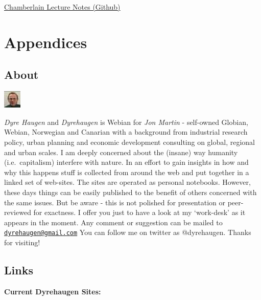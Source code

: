 \documentclass[
]{book}
\begin{document}
\href{https://github.com/paulgp/GaryChamberlainLectureNotes}{Chamberlain Lecture Notes (Github)}

\hypertarget{part-appendices}{%
\part{Appendices}\label{part-appendices}}

\hypertarget{appendix-appendices}{%
\appendix}


\hypertarget{about}{%
\chapter{About}\label{about}}

\includegraphics{fig/me.jpg}

\emph{Dyre Haugen} and \emph{Dyrehaugen} is Webian for \emph{Jon Martin} -
self-owned Globian, Webian, Norwegian and Canarian with
a background from industrial research policy, urban planning and
economic development consulting on global, regional and urban scales.
I am deeply concerned about the (insane) way
humanity (i.e.~capitalism) interfere with nature.
In an effort to gain insights in how and why this happens
stuff is collected from around the web and put together
in a linked set of web-sites.
The sites are operated as personal notebooks.
However, these days things can be easily published to the
benefit of others concerned with the same issues.
But be aware - this is not polished for presentation or
peer-reviewed for exactness.
I offer you just to have a look at my `work-desk' as it appears in the moment.
Any comment or suggestion can be mailed to \href{mailto:dyrehaugen@gmail.com}{\nolinkurl{dyrehaugen@gmail.com}}
You can follow me on twitter as @dyrehaugen.
Thanks for visiting!

\hypertarget{links}{%
\chapter{Links}\label{links}}

\textbf{Current Dyrehaugen Sites:}
\end{document}
